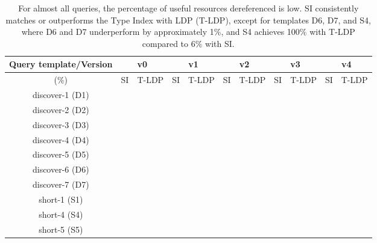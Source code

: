 \begin{table}[htbp]
	\begin{center}
		\begin{tabular}{|c|c|c|c|c|c|c|c|c|c|c|}
			\hline
            \multicolumn{1}{|c}{Query template/Version} & \multicolumn{2}{|c|}{v0} & \multicolumn{2}{|c|}{v1} & \multicolumn{2}{|c|}{v2} & \multicolumn{2}{|c|}{v3} & \multicolumn{2}{|c|}{v4} \\
			\hline
            (\%) & SI  & T-LDP & SI & T-LDP & SI & T-LDP& SI & T-LDP & SI & T-LDP \\
            \hline
			discover-1 (D1) & {} & {} & {} & {} & {} & {} & {} & {} & {} & {} \\
            \hline
            discover-2 (D2) & {} & {} & {} & {} & {} & {} & {} & {} & {} & {} \\
			\hline
            discover-3 (D3) & {} & {} & {} & {} & {} & {} & {} & {} & {} & {} \\
			\hline
            discover-4 (D4) & {} & {} & {} & {} & {} & {} & {} & {} & {} & {} \\
			\hline
            discover-5 (D5) & {} & {} & {} & {} & {} & {} & {} & {} & {} & {} \\
			\hline
            discover-6 (D6) & {} & {} & {} & {} & {} & {} & {} & {} & {} & {} \\
			\hline
            discover-7 (D7) & {} & {} & {} & {} & {} & {} & {} & {} & {} & {} \\
			\hline
            short-1 (S1) & {} & {} & {} & {} & {} & {} & {} & {} & {} & {} \\
			\hline
            short-4 (S4) & {} & {} & {} & {} & {} & {} & {} & {} & {} & {} \\
			\hline
            short-5 (S5) & {} & {} & {} & {} & {} & {} & {} & {} & {} & {} \\
			\hline
		\end{tabular}
	\end{center}
	\caption{
        For almost all queries, the percentage of useful resources dereferenced is low. 
		SI consistently matches or outperforms the Type Index with LDP (T-LDP), except for templates D6, D7, and S4, where D6 and D7 underperform by approximately 1\%, and S4 achieves 100\% with T-LDP compared to 6\% with SI.
		}
	\label{tab:ratioUsefulResources}
\end{table}